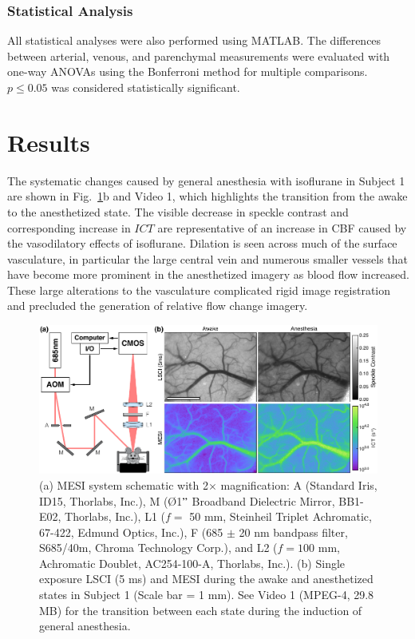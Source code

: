 \documentclass[review]{elsarticle}
\begin{document}
\subsubsection{Statistical Analysis}
All statistical analyses were also performed using MATLAB. The differences between arterial, venous, and parenchymal measurements were evaluated with one-way ANOVAs using the Bonferroni method for multiple comparisons. $p \leq 0.05$ was considered statistically significant.


\section{Results}

The systematic changes caused by general anesthesia with isoflurane in Subject 1 are shown in Fig.~\ref{fig:system}b and Video 1, which highlights the transition from the awake to the anesthetized state. The visible decrease in speckle contrast and corresponding increase in $ICT$ are representative of an increase in CBF caused by the vasodilatory effects of isoflurane. Dilation is seen across much of the surface vasculature, in particular the large central vein and numerous smaller vessels that have become more prominent in the anesthetized imagery as blood flow increased. These large alterations to the vasculature complicated rigid image registration and precluded the generation of relative flow change imagery.

\begin{figure}
    \includegraphics[width=\textwidth]{Figure1.pdf}
    \caption {
        (a) MESI system schematic with 2$\times$ magnification: A (Standard Iris, ID15, Thorlabs, Inc.), M ({{\O}}1$"$ Broadband Dielectric Mirror, BB1-E02, Thorlabs, Inc.), L1 ($f =$ 50 mm, Steinheil Triplet Achromatic, 67-422, Edmund Optics, Inc.), F (685 $\pm$ 20 nm bandpass filter, S685/40m, Chroma Technology Corp.), and L2 ($f = 100$ mm, Achromatic Doublet, AC254-100-A, Thorlabs, Inc.). (b) Single exposure LSCI (5 ms) and MESI during the awake and anesthetized states in Subject 1 (Scale bar = 1 mm). See Video 1 (MPEG-4, 29.8 MB) for the transition between each state during the induction of general anesthesia.
    }
    \label{fig:system}
\end{figure}
\end{document}
